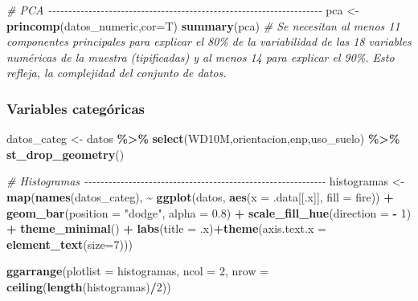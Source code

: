 \documentclass[12pt,a4paper,]{book}
\newenvironment{Shaded}{\begin{snugshade}}{\end{snugshade}}
\newcommand{\AttributeTok}[1]{\textcolor[rgb]{0.13,0.29,0.53}{#1}}
\newcommand{\CommentTok}[1]{\textcolor[rgb]{0.56,0.35,0.01}{\textit{#1}}}
\newcommand{\DecValTok}[1]{\textcolor[rgb]{0.00,0.00,0.81}{#1}}
\newcommand{\FloatTok}[1]{\textcolor[rgb]{0.00,0.00,0.81}{#1}}
\newcommand{\FunctionTok}[1]{\textcolor[rgb]{0.13,0.29,0.53}{\textbf{#1}}}
\newcommand{\NormalTok}[1]{#1}
\newcommand{\OtherTok}[1]{\textcolor[rgb]{0.56,0.35,0.01}{#1}}
\newcommand{\SpecialCharTok}[1]{\textcolor[rgb]{0.81,0.36,0.00}{\textbf{#1}}}
\newcommand{\StringTok}[1]{\textcolor[rgb]{0.31,0.60,0.02}{#1}}
\numberwithin{dummy}{section}
\theoremstyle{ocrenumbox}
\theoremstyle{blacknumex}
\theoremstyle{blacknumbox}
\theoremstyle{ocrenum}
\theoremstyle{ocrenum}
\begin{document}
\begin{Shaded}
\begin{Highlighting}[]
\CommentTok{\# PCA {-}{-}{-}{-}{-}{-}{-}{-}{-}{-}{-}{-}{-}{-}{-}{-}{-}{-}{-}{-}{-}{-}{-}{-}{-}{-}{-}{-}{-}{-}{-}{-}{-}{-}{-}{-}{-}{-}{-}{-}{-}{-}{-}{-}{-}{-}{-}{-}{-}{-}{-}{-}{-}{-}{-}{-}{-}{-}{-}{-}{-}{-}{-}{-}{-}{-}{-}{-}}
\NormalTok{pca }\OtherTok{\textless{}{-}} \FunctionTok{princomp}\NormalTok{(datos\_numeric,}\AttributeTok{cor=}\NormalTok{T)}
\FunctionTok{summary}\NormalTok{(pca) }
\CommentTok{\# Se necesitan al menos 11 componentes principales para explicar el 80\% de la variabilidad de las 18 variables numéricas de la muestra (tipificadas) y al menos 14 para explicar el 90\%. Esto refleja, la complejidad del conjunto de datos.}
\end{Highlighting}
\end{Shaded}

\hypertarget{variables-categuxf3ricas}{%
\subsubsection{Variables categóricas}\label{variables-categuxf3ricas}}

\begin{Shaded}
\begin{Highlighting}[]
\NormalTok{datos\_categ }\OtherTok{\textless{}{-}}\NormalTok{ datos }\SpecialCharTok{\%\textgreater{}\%}  
  \FunctionTok{select}\NormalTok{(WD10M,orientacion,enp,uso\_suelo) }\SpecialCharTok{\%\textgreater{}\%} 
  \FunctionTok{st\_drop\_geometry}\NormalTok{()}

\CommentTok{\# Histogramas {-}{-}{-}{-}{-}{-}{-}{-}{-}{-}{-}{-}{-}{-}{-}{-}{-}{-}{-}{-}{-}{-}{-}{-}{-}{-}{-}{-}{-}{-}{-}{-}{-}{-}{-}{-}{-}{-}{-}{-}{-}{-}{-}{-}{-}{-}{-}{-}{-}{-}{-}{-}{-}{-}{-}{-}{-}{-}{-}{-}}
\NormalTok{histogramas }\OtherTok{\textless{}{-}} \FunctionTok{map}\NormalTok{(}\FunctionTok{names}\NormalTok{(datos\_categ), }\SpecialCharTok{\textasciitilde{}} \FunctionTok{ggplot}\NormalTok{(datos, }\FunctionTok{aes}\NormalTok{(}\AttributeTok{x =}\NormalTok{ .data[[.x]], }\AttributeTok{fill =}\NormalTok{ fire)) }\SpecialCharTok{+}
                    \FunctionTok{geom\_bar}\NormalTok{(}\AttributeTok{position =} \StringTok{"dodge"}\NormalTok{, }\AttributeTok{alpha =} \FloatTok{0.8}\NormalTok{) }\SpecialCharTok{+}
                    \FunctionTok{scale\_fill\_hue}\NormalTok{(}\AttributeTok{direction =} \SpecialCharTok{{-}} \DecValTok{1}\NormalTok{) }\SpecialCharTok{+}
                    \FunctionTok{theme\_minimal}\NormalTok{() }\SpecialCharTok{+}
                    \FunctionTok{labs}\NormalTok{(}\AttributeTok{title =}\NormalTok{ .x)}\SpecialCharTok{+}\FunctionTok{theme}\NormalTok{(}\AttributeTok{axis.text.x =} \FunctionTok{element\_text}\NormalTok{(}\AttributeTok{size=}\DecValTok{7}\NormalTok{)))}

\FunctionTok{ggarrange}\NormalTok{(}\AttributeTok{plotlist =}\NormalTok{ histogramas, }\AttributeTok{ncol =} \DecValTok{2}\NormalTok{, }\AttributeTok{nrow =} \FunctionTok{ceiling}\NormalTok{(}\FunctionTok{length}\NormalTok{(histogramas)}\SpecialCharTok{/}\DecValTok{2}\NormalTok{))}
\end{Highlighting}
\end{Shaded}
\end{document}
